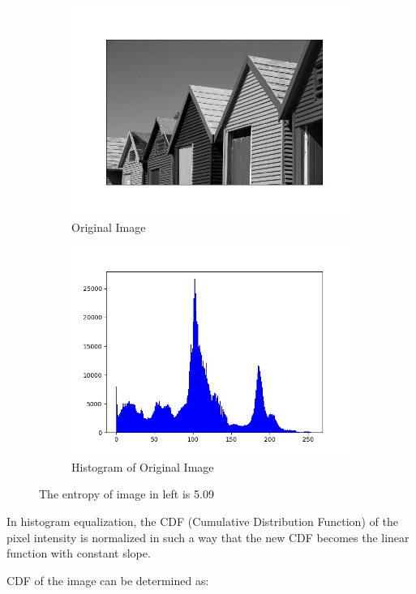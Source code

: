 \documentclass[12pt, a4paper, font = Times New Roman]{article}
\begin{document}
\begin{figure}[!h]
  \begin{subfigure}[b]{0.5\textwidth}
    \includegraphics[width=\textwidth]{Orginal_bw.jpeg}
    \caption{Original Image}
    \label{fig:Orginal_bw}
  \end{subfigure}
  \hfill
  \begin{subfigure}[b]{0.5\textwidth}
    \includegraphics[width=\textwidth]{orginal_hist.jpeg}
    \caption{Histogram of Original Image}
    \label{fig:orginal_hist}
  \end{subfigure}
  \caption{The entropy of image in left is 5.09}
\end{figure}
\par
In histogram equalization, the CDF (Cumulative Distribution Function) of the pixel intensity is normalized in such a way that the new CDF becomes the linear function with constant slope. 
\par
CDF of the image can be determined as:
\end{document}
